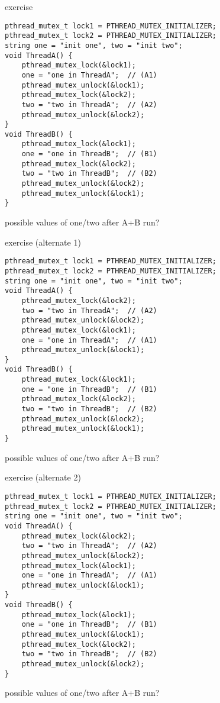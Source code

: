 \begin{frame}[fragile,label=lockEx]{exercise}
    \vspace{-0.5cm}
\begin{lstlisting}[style=smaller]
pthread_mutex_t lock1 = PTHREAD_MUTEX_INITIALIZER;
pthread_mutex_t lock2 = PTHREAD_MUTEX_INITIALIZER;
string one = "init one", two = "init two";
void ThreadA() {
    pthread_mutex_lock(&lock1);
    one = "one in ThreadA";  // (A1)
    pthread_mutex_unlock(&lock1);
    pthread_mutex_lock(&lock2);
    two = "two in ThreadA";  // (A2)
    pthread_mutex_unlock(&lock2);
}
void ThreadB() {
    pthread_mutex_lock(&lock1);
    one = "one in ThreadB";  // (B1)
    pthread_mutex_lock(&lock2);
    two = "two in ThreadB";  // (B2)
    pthread_mutex_unlock(&lock2);
    pthread_mutex_unlock(&lock1);
}
\end{lstlisting}
possible values of one/two after A+B run?
\end{frame}

\begin{frame}[fragile,label=lockExAlt1]{exercise (alternate 1)}
    \vspace{-0.5cm}
\begin{lstlisting}[style=smaller]
pthread_mutex_t lock1 = PTHREAD_MUTEX_INITIALIZER;
pthread_mutex_t lock2 = PTHREAD_MUTEX_INITIALIZER;
string one = "init one", two = "init two";
void ThreadA() {
    pthread_mutex_lock(&lock2);
    two = "two in ThreadA";  // (A2)
    pthread_mutex_unlock(&lock2);
    pthread_mutex_lock(&lock1);
    one = "one in ThreadA";  // (A1)
    pthread_mutex_unlock(&lock1);
}
void ThreadB() {
    pthread_mutex_lock(&lock1);
    one = "one in ThreadB";  // (B1)
    pthread_mutex_lock(&lock2);
    two = "two in ThreadB";  // (B2)
    pthread_mutex_unlock(&lock2);
    pthread_mutex_unlock(&lock1);
}
\end{lstlisting}
possible values of one/two after A+B run?
\end{frame}

\begin{frame}[fragile,label=lockExAlt2]{exercise (alternate 2)}
    \vspace{-0.5cm}
\begin{lstlisting}[style=smaller]
pthread_mutex_t lock1 = PTHREAD_MUTEX_INITIALIZER;
pthread_mutex_t lock2 = PTHREAD_MUTEX_INITIALIZER;
string one = "init one", two = "init two";
void ThreadA() {
    pthread_mutex_lock(&lock2);
    two = "two in ThreadA";  // (A2)
    pthread_mutex_unlock(&lock2);
    pthread_mutex_lock(&lock1);
    one = "one in ThreadA";  // (A1)
    pthread_mutex_unlock(&lock1);
}
void ThreadB() {
    pthread_mutex_lock(&lock1);
    one = "one in ThreadB";  // (B1)
    pthread_mutex_unlock(&lock1);
    pthread_mutex_lock(&lock2);
    two = "two in ThreadB";  // (B2)
    pthread_mutex_unlock(&lock2);
}
\end{lstlisting}
possible values of one/two after A+B run?
\end{frame}
